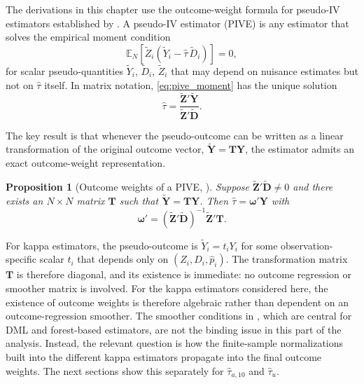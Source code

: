 \documentclass[12pt, a4paper, oneside]{article}
\theoremstyle{plain}
\newtheorem{proposition}{Proposition}[section]
\theoremstyle{definition}
\begin{document}
The derivations in this chapter use the outcome-weight formula for
pseudo-IV estimators established by \citet{knaus2024treatment}.
A pseudo-IV estimator (PIVE) is any estimator that solves the empirical moment condition
\begin{equation}
  \mathbb{E}_N\!\left[\widetilde{Z}_i\left(\widetilde{Y}_i
  - \hat\tau\,\widetilde{D}_i\right)\right] = 0,
  \label{eq:pive_moment}
\end{equation}
for scalar pseudo-quantities $\widetilde{Y}_i$, $\widetilde{D}_i$, $\widetilde{Z}_i$
that may depend on nuisance estimates but not on $\hat\tau$ itself.
In matrix notation, \eqref{eq:pive_moment} has the unique solution
\begin{equation}
  \hat\tau
  = \frac{\widetilde{\mathbf{Z}}'\widetilde{\mathbf{Y}}}
         {\widetilde{\mathbf{Z}}'\widetilde{\mathbf{D}}}.
  \label{eq:pive_sol}
\end{equation}
 
The key result is that whenever the pseudo-outcome can be written as a linear
transformation of the original outcome vector, $\widetilde{\mathbf{Y}} = \mathbf{T}\mathbf{Y}$,
the estimator admits an exact outcome-weight representation.
 
\begin{proposition}[Outcome weights of a PIVE, {\citealt[Proposition~1]{knaus2024treatment}}]
\label{prop:pive_weights}
Suppose $\widetilde{\mathbf{Z}}'\widetilde{\mathbf{D}} \neq 0$ and there exists an
$N \times N$ matrix $\mathbf{T}$ such that $\widetilde{\mathbf{Y}} = \mathbf{T}\mathbf{Y}$.
Then $\hat\tau = \boldsymbol{\omega}'\mathbf{Y}$ with
\begin{equation}
  \boldsymbol{\omega}'
  = \left(\widetilde{\mathbf{Z}}'\widetilde{\mathbf{D}}\right)^{-1}
    \widetilde{\mathbf{Z}}'\mathbf{T}.
  \label{eq:pive_weights}
\end{equation}
\end{proposition}
 
For kappa estimators, the pseudo-outcome is $\widetilde{Y}_i = t_i Y_i$ for some
observation-specific scalar $t_i$ that depends only on $(Z_i, D_i, \hat{p}_i)$.
The transformation matrix $\mathbf{T}$ is therefore diagonal, and its existence is
immediate: no outcome regression or smoother matrix is involved.
For the kappa estimators considered here, the existence of outcome weights is therefore
algebraic rather than dependent on an outcome-regression smoother. The smoother
conditions in \citet[Section~4.2]{knaus2024treatment}, which are central for DML and
forest-based estimators, are not the binding issue in this part of the analysis.
Instead, the relevant question is how the finite-sample normalizations built into the
different kappa estimators propagate into the final outcome weights. The next sections
show this separately for $\hat\tau_{a,10}$ and $\hat\tau_u$.
 
\end{document}
